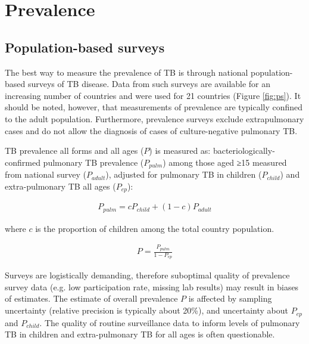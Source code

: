 \section{Prevalence}

\subsection{Population-based surveys}
The best way to measure the prevalence of TB is through national population-based surveys of TB disease\cite{18713496}\cite{WHO2011}. Data from such surveys are available for an increasing number of countries and were used for 21 countries (Figure \ref{fig:ps}). It should be noted, however, that measurements of prevalence are typically confined to the adult population. Furthermore, prevalence surveys exclude extrapulmonary cases and do not allow the diagnosis of cases of culture-negative pulmonary TB. 

TB prevalence all forms and all ages ($P$) is measured as:  bacteriologically-confirmed pulmonary TB prevalence ($P_{pulm}$) among those aged ≥15 measured from national survey ($P_{adult}$), adjusted for pulmonary TB in children ($P_{child}$) and extra-pulmonary TB all ages ($P_{ep}$):

\begin{align*}
P_{pulm} = c P_{child} + (1 − c) P_{adult}
\end{align*}

where $c$ is the proportion of children among the total country population.

\begin{align*}
P = \frac{P_{pulm}}{1 - P_{ep}}
\end{align*}

Surveys are logistically demanding, therefore suboptimal quality of prevalence survey data (e.g. low participation rate, missing lab results) may result in biases of estimates. The estimate of overall prevalence $P$ is affected by sampling uncertainty (relative precision is typically about 20\%), and uncertainty about $P_{ep}$ and $P_{child}$. The  quality of routine surveillance data to inform levels of pulmonary TB in children and extra-pulmonary TB for all ages is often questionable.



 